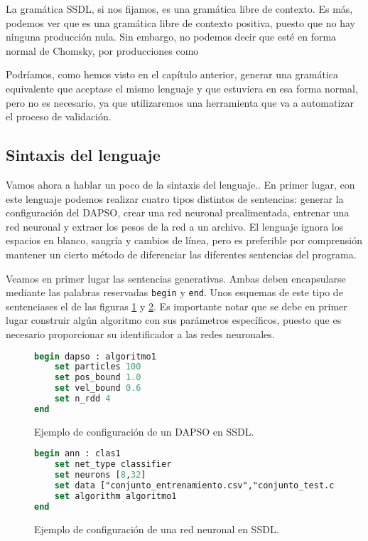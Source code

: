 \vspace{10pt}
La gramática SSDL, si nos fijamos, es una gramática libre de contexto. Es más, podemos ver que es una gramática
libre de contexto positiva, puesto que no hay ninguna producción nula. Sin embargo, no podemos decir que esté
en forma normal de Chomsky, por producciones como
\begin{bnf*}
    {  }
\end{bnf*}
Podríamos, como hemos visto en el capítulo anterior, generar una gramática equivalente que aceptase el mismo
lenguaje y que estuviera en esa forma normal, pero no es necesario, ya que utilizaremos una herramienta que va
a automatizar el proceso de validación.

\subsection{Sintaxis del lenguaje}

Vamos ahora a hablar un poco de la sintaxis del lenguaje.. En primer lugar, con este lenguaje podemos realizar
cuatro tipos distintos de sentencias: generar la configuración del DAPSO, crear una red neuronal prealimentada,
entrenar una red neuronal y extraer los pesos de la red a un archivo. El lenguaje ignora los espacios en blanco,
sangría y cambios de línea, pero es preferible por comprensión mantener un cierto método de diferenciar las 
diferentes sentencias del programa.

\vspace{10pt}
Veamos en primer lugar las sentencias generativas. Ambas deben encapsularse mediante las palabras reservadas
\texttt{begin} y \texttt{end}. Unos esquemas de este tipo de sentenciases el de las figuras \ref{fig:ssdl-dapso} y
\ref{fig:ssdl-ann}. Es importante notar que se debe en primer lugar construir algún algoritmo con sus parámetros
específicos, puesto que es necesario proporcionar su identificador a las redes neuronales.

\begin{figure}[ht!]
\begin{lstlisting}[language=Pascal]
begin dapso : algoritmo1
    set particles 100
    set pos_bound 1.0
    set vel_bound 0.6
    set n_rdd 4
end
\end{lstlisting}
    \caption{Ejemplo de configuración de un DAPSO en SSDL.}
    \label{fig:ssdl-dapso}
\end{figure}

\begin{figure}[ht!]
\begin{lstlisting}[language=Pascal]
begin ann : clas1
    set net_type classifier
    set neurons [8,32]
    set data ["conjunto_entrenamiento.csv","conjunto_test.csv"]
    set algorithm algoritmo1
end
\end{lstlisting}
    \caption{Ejemplo de configuración de una red neuronal en SSDL.}
    \label{fig:ssdl-ann}
\end{figure}

